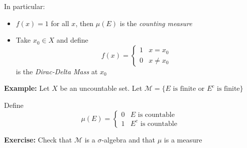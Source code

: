 \documentclass[12pt]{report}
\newcommand{\M}{\mathcal{M}}
\newenvironment*{exercise}[1][red]{
    \begin{tcolorbox}[
        parbox=false,
        colback=#1!5!white,
        colframe=#1!75!black,
        breakable
    ]}
    {\end{tcolorbox}}
\begin{document}
        In particular:
        \begin{itemize}
            \item $f(x) = 1$ for all $x$, then $\mu(E)$ is the \emph{counting measure}
            \item Take $x_0 \in X$ and define 
            \[f(x) = \begin{cases}
                1 & x = x_0\\
                0 & x \neq x_0
            \end{cases}\] 
            is the \emph{Dirac-Delta Mass} at $x_0$ 
        \end{itemize}

        \textbf{Example:} Let $X$ be an uncountable set. Let $\M = \{E \text{ is finite or } E^c \text{ is finite}\}$
        
        Define 
        \[\mu(E) = \begin{cases}
            0 & E \text{ is countable}\\
            1 & E^c \text{ is countable}
        \end{cases}\]

        \begin{exercise}
            \textbf{Exercise:} Check that $\M$ is a $\sigma$-algebra and that $\mu$ is a measure
        \end{exercise}
\end{document}
